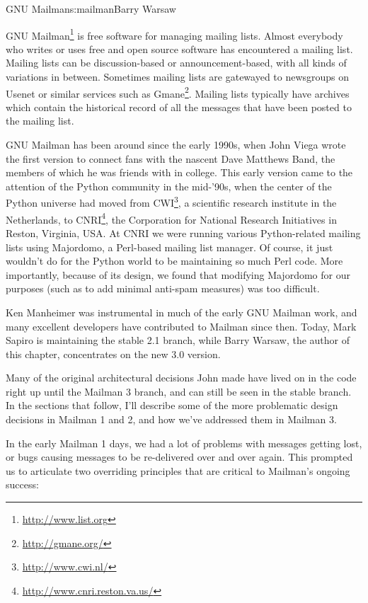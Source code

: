 \begin{aosachapter}{GNU Mailman}{s:mailman}{Barry Warsaw}

GNU Mailman\footnote{\url{http://www.list.org}} is free software for
managing mailing lists.  Almost everybody who writes or uses free and
open source software has encountered a mailing list.  Mailing
lists can be discussion-based or announcement-based, with all kinds of
variations in between.  Sometimes mailing lists are gatewayed to
newsgroups on Usenet or similar services such as
Gmane\footnote{\url{http://gmane.org/}}.  Mailing lists typically have
archives which contain the historical record of all the messages that
have been posted to the mailing list.

GNU Mailman has been around since the early 1990s, when John Viega
wrote the first version to connect fans with the nascent Dave Matthews
Band, the members of which he was friends with in college.  This early version came to
the
attention of the Python community in the mid-'90s, when the center of the Python universe
had moved from CWI\footnote{\url{http://www.cwi.nl/}}, a scientific research institute in the
Netherlands, to CNRI\footnote{\url{http://www.cnri.reston.va.us/}}, 
the Corporation for National Research Initiatives in
Reston, Virginia, USA.  At CNRI we were running various
Python-related mailing lists using Majordomo, a Perl-based mailing
list manager.  Of course, it just wouldn't do for the Python world to
be maintaining so much Perl code.  More importantly, because of its
design, we found that modifying Majordomo for our purposes (such as to
add minimal anti-spam measures) was too difficult.  

Ken Manheimer was
instrumental in much of the early GNU Mailman work, and many excellent
developers have contributed to Mailman since then.  Today, Mark Sapiro
is maintaining the stable 2.1 branch, while Barry Warsaw, the author of
this chapter, concentrates on the new 3.0 version.

Many of the original architectural decisions John made have lived on
in the code right up until the Mailman 3 branch, and can still be seen
in the stable branch.  In the sections that follow, I'll describe some
of the more problematic design decisions in Mailman 1 and 2, and how
we've addressed them in Mailman 3.

In the early Mailman 1 days, we had a lot of problems with messages
getting lost, or bugs causing messages to be re-delivered over and
over again.  This prompted us to articulate two overriding principles
that are critical to Mailman's ongoing success:


\end{aosachapter}
